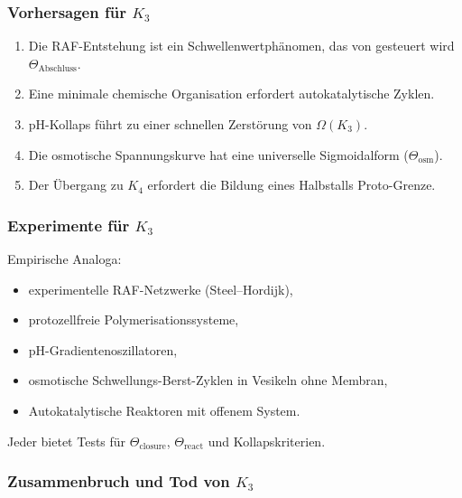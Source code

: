 \subsubsection{Vorhersagen für \texorpdfstring{$K_3$}{K_3}}

\begin{enumerate}
    \item Die RAF-Entstehung ist ein Schwellenwertphänomen, das von gesteuert wird
          $\Theta_{\mathrm{Abschluss}}$.
    \item Eine minimale chemische Organisation erfordert autokatalytische Zyklen.
    \item pH-Kollaps führt zu einer schnellen Zerstörung von $\Omega(K_3)$.
    \item Die osmotische Spannungskurve hat eine universelle Sigmoidalform
          ($\Theta_{\mathrm{osm}}$).
    \item Der Übergang zu $K_4$ erfordert die Bildung eines Halbstalls
          Proto-Grenze.
\end{enumerate}

\subsubsection{Experimente für \texorpdfstring{$K_3$}{K_3}}

Empirische Analoga:
\begin{itemize}
    \item experimentelle RAF-Netzwerke (Steel–Hordijk),
    \item protozellfreie Polymerisationssysteme,
    \item pH-Gradientenoszillatoren,
    \item osmotische Schwellungs-Berst-Zyklen in Vesikeln ohne Membran,
    \item Autokatalytische Reaktoren mit offenem System.
\end{itemize}

Jeder bietet Tests für $\Theta_{\mathrm{closure}}$,
$\Theta_{\mathrm{react}}$ und Kollapskriterien.

\subsubsection{Zusammenbruch und Tod von \texorpdfstring{$K_3$}{K_3}}
\label{sec:k3-collapse}

